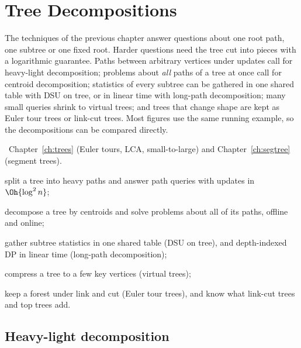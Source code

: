 \chapter{Tree Decompositions}\label{ch:treedecomp}

The techniques of the previous chapter answer questions about one root path, one subtree or one fixed root. Harder questions
need the tree cut into pieces with a logarithmic guarantee. Paths between arbitrary vertices under updates call for heavy-light
decomposition; problems about \emph{all} paths of a tree at once call for centroid decomposition; statistics of every subtree
can be gathered in one shared table with DSU on tree, or in linear time with long-path decomposition; many small queries shrink
to virtual trees; and trees that change shape are kept as Euler tour trees or link-cut trees. Most figures use the same running
example, so the decompositions can be compared directly.

\begin{chapterintro}{\plat\ \ioi}{Chapter~\ref{ch:trees} (Euler tours, LCA, small-to-large) and Chapter~\ref{ch:segtree}
(segment trees).}
  \item split a tree into heavy paths and answer path queries with updates in $\Oh{\log^2 n}$;
  \item decompose a tree by centroids and solve problems about all of its paths, offline and online;
  \item gather subtree statistics in one shared table (DSU on tree), and depth-indexed DP in linear time (long-path
        decomposition);
  \item compress a tree to a few key vertices (virtual trees);
  \item keep a forest under link and cut (Euler tour trees), and know what link-cut trees and top trees add.
\end{chapterintro}

\newcommand{\rexcoords}{%
  \foreach \nm/\px/\py in {0/3.0/0, 1/1.2/-1.1, 2/4.4/-1.1, 3/6.0/-1.1, 4/0.6/-2.2, 5/1.8/-2.2, 6/4.4/-2.2, 7/0.0/-3.3,
      8/1.2/-3.3, 9/3.8/-3.3, 10/5.0/-3.3, 11/0.0/-4.4, 12/5.0/-4.4}
    \coordinate (R\nm) at (\px, \py);}
\newcommand{\rexedges}{(R0) -- (R1) -- (R4) -- (R7) -- (R11) (R2) -- (R6) -- (R10) -- (R12) (R0) -- (R2) (R0) -- (R3)
  (R1) -- (R5) (R4) -- (R8) (R6) -- (R9)}

\section[Heavy-light decomposition]{Heavy-light decomposition \hfill \plat}\label{sec:hld}

